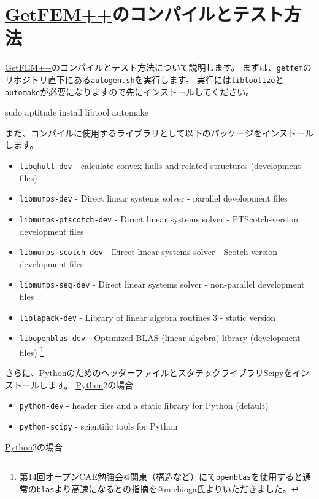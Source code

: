 \documentclass{../../style/ltjoc}
\begin{document}
\section{\href{http://getfem.org}{GetFEM++}のコンパイルとテスト方法}
\href{http://getfem.org}{GetFEM++}のコンパイルとテスト方法について説明します。
まずは、\texttt{getfem}のリポジトリ直下にある\texttt{autogen.sh}を実行します。
実行には\texttt{libtoolize}と\texttt{automake}が必要になりますので先にインストールしてください。
\begin{shbox}
  \shline{} {sudo aptitude install libtool automake}
\end{shbox}
また、コンパイルに使用するライブラリとして以下のパッケージをインストールします。
\begin{itemize}
  \item \texttt{libqhull-dev} - calculate convex hulls and related structures (development files)
  \item \texttt{libmumps-dev} - Direct linear systems solver - parallel development files                  
  \item \texttt{libmumps-ptscotch-dev} - Direct linear systems solver - PTScotch-version development files          
  \item \texttt{libmumps-scotch-dev} - Direct linear systems solver - Scotch-version development files            
  \item \texttt{libmumps-seq-dev} - Direct linear systems solver - non-parallel development files              
  \item \texttt{liblapack-dev} - Library of linear algebra routines 3 - static version
  \item \texttt{libopenblas-dev} - Optimized BLAS (linear algebra) library (development files)
  \footnote{
    第14回オープンCAE勉強会@関東（構造など）にて\texttt{openblas}を使用すると通常の\texttt{blas}より高速になるとの指摘を\href{https://twitter.com/michioga}{@michioga}氏よりいただきました。
  }
\end{itemize}
さらに、\href{https://www.python.org/}{Python}のためのヘッダーファイルとスタテックライブラリScipyをインストールします。
\href{https://www.python.org/}{Python}2の場合
\begin{itemize}
  \item \texttt{python-dev} - header files and a static library for Python (default)
  \item \texttt{python-scipy} - scientific tools for Python
\end{itemize}
\href{https://www.python.org/}{Python}3の場合
\end{document}

